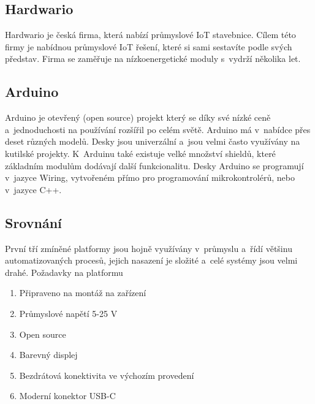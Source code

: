 \subsection{Hardwario}
Hardwario\cite{HARDWARIO} je česká firma, která nabízí průmyslové IoT stavebnice.
Cílem této firmy je nabídnou průmyslové IoT řešení, které si sami sestavíte podle svých představ.
Firma se zaměřuje na nízkoenergetické moduly s~vydrží několika let.



\subsection{Arduino}
Arduino \cite{ARDUINO} je otevřený (open source) projekt který se díky své nízké ceně a~jednoduchosti na používání rozšířil po celém světě.
Arduino má v~nabídce přes deset různých modelů. Desky jsou univerzální a~jsou velmi často využívány na kutilské projekty.
K~Arduinu také existuje velké množství shieldů, které základním modulům dodávají další funkcionalitu. 
Desky Arduino se programují v~jazyce Wiring, vytvořeném přímo pro programování mikrokontrolérů, nebo v~jazyce C++. 




\subsection{Srovnání}

První tří zmíněné platformy jsou hojně využívány v~průmyslu a~řídí většinu automatizovaných procesů, jejich nasazení je složité a~celé systémy jsou velmi drahé.\newline
Požadavky na platformu
\begin{enumerate}
    \item Připraveno na montáž na zařízení
    \item Průmyslové napětí 5-25 V
    \item Open source
    \item Barevný displej
    \item Bezdrátová konektivita ve výchozím provedení
		\item Moderní konektor USB-C
  \end{enumerate}


